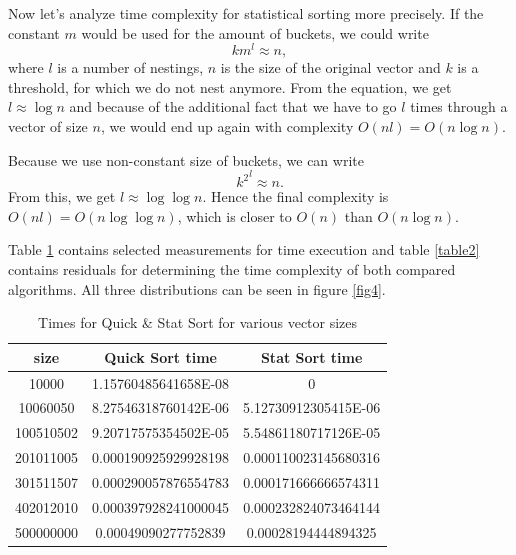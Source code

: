 \documentclass[12pt]{article}
\begin{document}
        Now let's analyze time complexity for statistical sorting more precisely. If the constant $m$ would be used for the amount of buckets, we could write
        \[
        k m^l \approx n, 
        \]
        where $l$ is a number of nestings, $n$ is the size of the original vector and $k$ is a threshold, for which we do not nest anymore. From the equation, we get $l \approx \log n$ and because of the additional fact that we have to go $l$ times through a vector of size $n$, we would end up again with complexity $O(n l) = O(n \log n)$.

        Because we use non-constant size of buckets, we can write
        \[
        {k^2}^l \approx n.
        \]
        From this, we get $l \approx \log \log n$. Hence the final complexity is $O(n l) = O(n \log \log n)$, which is closer to $O(n)$ than $O(n \log n)$.
			
		Table \ref{table1} contains selected measurements for time execution and table \ref{table2} contains residuals for determining the time complexity of both compared algorithms. All three distributions can be seen in figure \ref{fig4}.
		
		\begin{table}
		\caption{Times for Quick \& Stat Sort for various vector sizes}
		\begin{center}
		\begin{tabular}{ |c|c|c| }
		
		\hline
		
		size & Quick Sort time & Stat Sort time \\

		\hline\hline		
		
		10000		& 1.15760485641658E-08	& 0 \\
		10060050    & 8.27546318760142E-06	& 5.12730912305415E-06 \\
		100510502	& 9.20717575354502E-05	& 5.54861180717126E-05 \\
		201011005	& 0.000190925929928198	& 0.000110023145680316 \\
		301511507	& 0.000290057876554783	& 0.000171666666574311 \\
		402012010	& 0.000397928241000045	& 0.000232824073464144 \\
		500000000	& 0.00049090277752839	& 0.00028194444894325 \\

		\hline
		\end{tabular}
		\end{center}
		\label{table1}
		\end{table}
\end{document}
